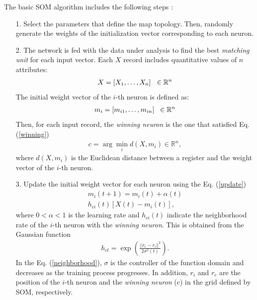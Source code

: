 \documentclass[5p,authoryear,preprint,12pt]{elsarticle}
\begin{document}
The basic SOM algorithm includes the following steps \citep[see,][]{kohonen1995springer,shieh2012new}:
\begin{itemize}
	\item[1.] Select the parameters that define the map topology. Then, randomly generate the weights of the initialization vector corresponding to each neuron.
	\item[2.] The network is fed with the data under analysis to find the best \emph{matching unit} for each input vector. Each $X$ record includes quantitative values of $n$ attributes:
	\begin{eqnarray}\label{input}
	X=[X_{1},\ldots,X_{n}] \hspace{0.2cm} \in \mathbb{R}^{n}
	\end{eqnarray}
	The initial weight vector of the $i$-th neuron is defined as:
	\begin{eqnarray}\label{weight}
	m_{i}=[m_{i1},\ldots,m_{in}]\hspace{0.2cm} \in \mathbb{R}^{n}
	\end{eqnarray}
	Then, for each input record, the \emph{winning neuron} is the one that satisfied Eq. (\ref{winning})
	\begin{align}\label{winning}
	c=\arg\min_{i}{d(X,m_{i})} \in \mathbb{R}^{n},
	\end{align}
	where $d(X,m_{i})$ is the Euclidean distance between a register and the weight vector of the $i$-th neuron.
	\item[3.] Update the initial weight vector for each neuron using the Eq. (\ref{update})
	\begin{multline}\label{update}
	m_{i}(t+1)=m_{i}(t)+\alpha(t) \\ h_{ci}(t)[X(t)- m_{i}(t)],
	\end{multline}
	where $0<\alpha<1$ is the learning rate and $h_{ci}(t)$ indicate the neighborhood rate of the $i$-th neuron with the \emph{winning neuron}. This is obtained from the Gaussian function
	\begin{eqnarray}\label{neighborhood}
	h_{ct}=\exp\left(\frac{||r_{c}-r_{i}||^{2}}{2\sigma^{2}(t)}\right).
	\end{eqnarray}
	In the Eq. (\ref{neighborhood}), $\sigma$ is the controller of the function domain and decreases as the training process progresses. In addition, $r_{i}$ and $r_{c}$ are the position of the $i$-th neuron and the \emph{winning neuron} (c) in the grid defined by SOM, respectively.
\end{itemize}
\end{document}
